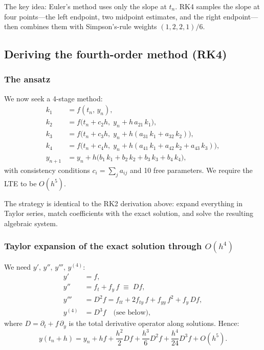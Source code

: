 \documentclass[12pt,a4paper]{article}
\theoremstyle{definition}
\theoremstyle{plain}
\theoremstyle{remark}
\begin{document}
The key idea: Euler's method uses only the slope at $t_n$. RK4 samples the slope at four points---the left endpoint, two midpoint estimates, and the right endpoint---then combines them with Simpson's-rule weights $(1,2,2,1)/6$.

\subsection{Deriving the fourth-order method (RK4)}

\subsubsection{The ansatz}

We now seek a 4-stage method:
\begin{equation}\label{eq:rk4app_rk4_ansatz}
  \begin{aligned}
    k_1 &= f(t_n, \, y_n), \\
    k_2 &= f\big(t_n + c_2 h, \; y_n + h\, a_{21}\, k_1\big), \\
    k_3 &= f\big(t_n + c_3 h, \; y_n + h(a_{31}\, k_1 + a_{32}\, k_2)\big), \\
    k_4 &= f\big(t_n + c_4 h, \; y_n + h(a_{41}\, k_1 + a_{42}\, k_2 + a_{43}\, k_3)\big), \\
    y_{n+1} &= y_n + h\big(b_1\, k_1 + b_2\, k_2 + b_3\, k_3 + b_4\, k_4\big),
  \end{aligned}
\end{equation}
with consistency conditions $c_i = \sum_j a_{ij}$ and 10 free parameters. We require the LTE to be $O(h^5)$.

The strategy is identical to the RK2 derivation above: expand everything in Taylor series, match coefficients with the exact solution, and solve the resulting algebraic system.

\subsubsection{Taylor expansion of the exact solution through $O(h^4)$}

We need $y',\, y'',\, y''',\, y^{(4)}$:
\begin{align}
  y' &= f, \label{eq:rk4app_y1}\\
  y'' &= f_t + f_y\, f \;\equiv\; Df, \label{eq:rk4app_y2}\\
  y''' &= D^2f = f_{tt} + 2f_{ty}\,f + f_{yy}\,f^2 + f_y\, Df, \label{eq:rk4app_y3}\\
  y^{(4)} &= D^3f \quad\text{(see below)}, \label{eq:rk4app_y4}
\end{align}
where $D = \partial_t + f\,\partial_y$ is the total derivative operator along solutions. Hence:
\begin{equation}\label{eq:rk4app_exact4}
  y(t_n + h) = y_n + hf + \frac{h^2}{2}Df + \frac{h^3}{6}D^2f + \frac{h^4}{24}D^3f + O(h^5).
\end{equation}
\end{document}
